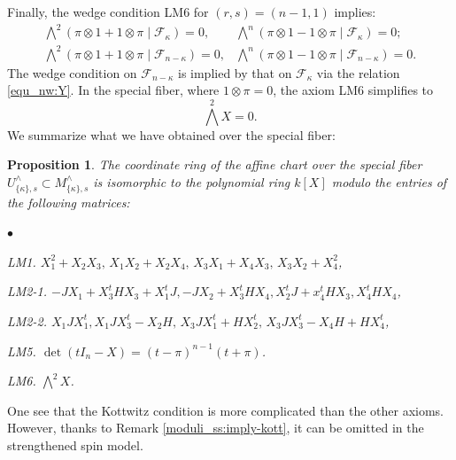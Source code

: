 \documentclass[pdflatex,sn-mathphys-num]{sn-jnl}%
\theoremstyle{thmstyleone}%
\newtheorem{proposition}[subsubsection]{Proposition}%
\theoremstyle{thmstyletwo}%
\numberwithin{equation}{subsection}
\theoremstyle{thmstylethree}%
\newcommand{\CF}{\ensuremath{\mathcal{F}}\xspace}
\newenvironment{altitemize}
	{\begin{list}
			{$\bullet$}
			{\setlength{\labelwidth}{0pt}
				\setlength{\itemindent}{5pt}
				\setlength{\labelsep}{5pt}
				\setlength{\leftmargin}{0pt}
				\setlength{\itemsep}{\the\smallskipamount}
		}}
		{\end{list}}
\begin{document}
Finally, the wedge condition {\selectfont LM6} for $(r,s)=(n-1,1)$ implies:
\begin{equation*}
    \begin{matrix}
		\bigwedge^2 (\pi\otimes 1+1\otimes \pi\mid \CF_\kappa)=0,	&	\bigwedge^n (\pi\otimes 1-1\otimes \pi\mid \CF_\kappa)=0;\\
		\bigwedge^2 (\pi\otimes 1+1\otimes \pi\mid \CF_{n-\kappa})=0,	&	\bigwedge^n (\pi\otimes 1-1\otimes \pi\mid \CF_{n-\kappa})=0.
	\end{matrix}
\end{equation*}
The wedge condition on $\CF_{n-\kappa}$ is implied by that on $\CF_\kappa$ via the relation \eqref{equ_nw:Y}.
In the special fiber, where $1\otimes \pi=0$, the axiom {\selectfont LM6} simplifies to
\begin{equation*}
	\bigwedge^2 X=0.
\end{equation*}		
We summarize what we have obtained over the special fiber:
\begin{proposition}\label{equ_nw:summary}
    The coordinate ring of the affine chart over the special fiber $U^\wedge_{\{\kappa\},s}\subset M^\wedge_{\{\kappa\},s}$ is isomorphic to the polynomial ring $k[X]$ modulo the entries of the following matrices:
\begin{altitemize}
    \item[\fontfamily{cmtt}\selectfont LM1.] $X_1^2+X_2X_3,
    \,X_1X_2+X_2X_4,
    \,X_3X_1+X_4X_3,
    \,X_3X_2+X_4^2$,
				
    \item[\fontfamily{cmtt}\selectfont LM2-1.] $-JX_1+X_3^t HX_3+X_1^t J,-JX_2+X_3^tHX_4,X_2^tJ+x_4^tHX_3,X_4^tHX_4$,
				
    \item[\fontfamily{cmtt}\selectfont LM2-2.] $X_1JX_1^t,X_1JX_3^t-X_2H,
    \,X_3JX_1^t+HX_2^t,
    \,X_3JX_3^t-X_4H+HX_4^t$,

    \item[\fontfamily{cmtt}\selectfont LM5.] $\det(tI_n-X)=(t-\pi)^{n-1}(t+\pi)$.
    
    \item[\fontfamily{cmtt}\selectfont LM6.] $\bigwedge^2X$.
\end{altitemize} 
\end{proposition}

One see that the Kottwitz condition is more complicated than the other axioms. However, thanks to Remark \ref{moduli_ss:imply-kott}, it can be omitted in the strengthened spin model.
  
\end{document}

